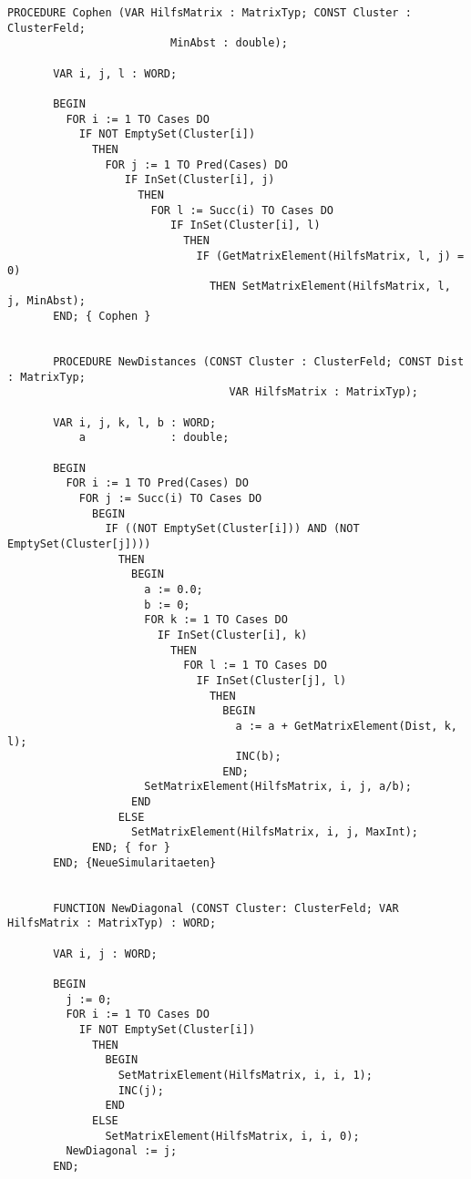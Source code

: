 \begin{refsection}
\begin{lstlisting}[caption=clustering]
       PROCEDURE Cophen (VAR HilfsMatrix : MatrixTyp; CONST Cluster : ClusterFeld;
                         MinAbst : double);

       VAR i, j, l : WORD;

       BEGIN
         FOR i := 1 TO Cases DO
           IF NOT EmptySet(Cluster[i])
             THEN
               FOR j := 1 TO Pred(Cases) DO
                  IF InSet(Cluster[i], j)
                    THEN
                      FOR l := Succ(i) TO Cases DO
                         IF InSet(Cluster[i], l)
                           THEN
                             IF (GetMatrixElement(HilfsMatrix, l, j) = 0)
                               THEN SetMatrixElement(HilfsMatrix, l, j, MinAbst);
       END; { Cophen }


       PROCEDURE NewDistances (CONST Cluster : ClusterFeld; CONST Dist : MatrixTyp;
                                  VAR HilfsMatrix : MatrixTyp);

       VAR i, j, k, l, b : WORD;
           a             : double;

       BEGIN
         FOR i := 1 TO Pred(Cases) DO
           FOR j := Succ(i) TO Cases DO
             BEGIN
               IF ((NOT EmptySet(Cluster[i])) AND (NOT EmptySet(Cluster[j])))
                 THEN
                   BEGIN
                     a := 0.0;
                     b := 0;
                     FOR k := 1 TO Cases DO
                       IF InSet(Cluster[i], k)
                         THEN
                           FOR l := 1 TO Cases DO
                             IF InSet(Cluster[j], l)
                               THEN
                                 BEGIN
                                   a := a + GetMatrixElement(Dist, k, l);
                                   INC(b);
                                 END;
                     SetMatrixElement(HilfsMatrix, i, j, a/b);
                   END
                 ELSE
                   SetMatrixElement(HilfsMatrix, i, j, MaxInt);
             END; { for }
       END; {NeueSimularitaeten}


       FUNCTION NewDiagonal (CONST Cluster: ClusterFeld; VAR HilfsMatrix : MatrixTyp) : WORD;

       VAR i, j : WORD;

       BEGIN
         j := 0;
         FOR i := 1 TO Cases DO
           IF NOT EmptySet(Cluster[i])
             THEN
               BEGIN
                 SetMatrixElement(HilfsMatrix, i, i, 1);
                 INC(j);
               END
             ELSE
               SetMatrixElement(HilfsMatrix, i, i, 0);
         NewDiagonal := j;
       END;



\end{lstlisting}
\end{refsection}
